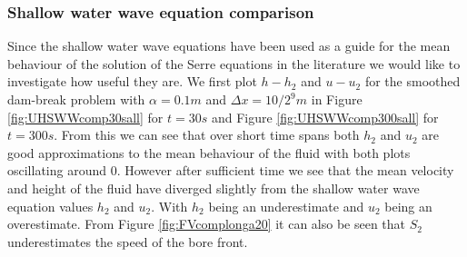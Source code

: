\documentclass[SingleSpace,12pt,Journal]{Serre_ASCE}
\begin{document}
\subsubsection{Shallow water wave equation comparison}
Since the shallow water wave equations have been used as a guide for the mean behaviour of the solution of the Serre equations in the literature \cite{Hank-etal-2010-2034,Mitsotakis-etal-2014} we would like to investigate how useful they are. 
We first plot $h - h_2$ and $u - u_2$ for the smoothed dam-break problem with $\alpha = 0.1m$ and $\Delta x = {10}/{2^9}m$ in Figure \ref{fig:UHSWWcomp30sall} for $t= 30s$ and Figure \ref{fig:UHSWWcomp300sall} for $t= 300s$. From this we can see that over short time spans both $h_2$ and $u_2$ are good approximations to the mean behaviour of the fluid with both plots oscillating around $0$. However after sufficient time we see that the mean velocity and height of the fluid have diverged slightly from the shallow water wave equation values $h_2$ and $u_2$. With $h_2$ being an underestimate and $u_2$ being an overestimate. From Figure \ref{fig:FVcomplonga20} it can also be seen that $S_2$ underestimates the speed of the bore front.
\end{document}
